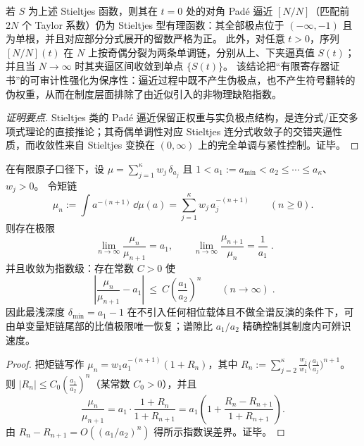 


\begin{proposition}\label{prop:xi-pade-stieltjes-order-preserving}
若 \(S\) 为上述 Stieltjes 函数，则其在 \(t=0\) 处的对角 Pad\'e 逼近 \([N/N]\)（匹配前 \(2N\) 个 Taylor 系数）仍为 Stieltjes 型有理函数：其全部极点位于 \((-\infty,-1)\) 且为单根，并且对应部分分式展开的留数严格为正。
此外，对任意 \(t>0\)，序列 \([N/N](t)\) 在 \(N\) 上按奇偶分裂为两条单调链，分别从上、下夹逼真值 \(S(t)\)；并且当 \(N\to\infty\) 时其夹逼区间收敛到单点 \(\{S(t)\}\)。
该结论把“有限寄存器证书”的可审计性强化为保序性：逼近过程中既不产生伪极点，也不产生符号翻转的伪权重，从而在制度层面排除了由近似引入的非物理缺陷指数。
\end{proposition}
\begin{proof}[证明要点]
Stieltjes 类的 Pad\'e 逼近保留正权重与实负极点结构，是连分式/正交多项式理论的直接推论；其奇偶单调性对应 Stieltjes 连分式收敛子的交错夹逼性质，而收敛性来自 Stieltjes 变换在 \((0,\infty)\) 上的完全单调与紧性控制。证毕。
\end{proof}

\begin{proposition}\label{prop:xi-moment-ratio-identifies-amin}
在有限原子口径下，设
\(
\mu=\sum_{j=1}^{\kappa} w_j\,\delta_{a_j}
\)
且 \(1<a_1:=a_{\min}<a_2\le\cdots\le a_{\kappa}\)、\(w_j>0\)。
令矩链
\[
\mu_n:=\int a^{-(n+1)}\,\dd\mu(a)=\sum_{j=1}^{\kappa} w_j\,a_j^{-(n+1)}\qquad(n\ge 0).
\]
则存在极限
\[
\boxed{\;
\lim_{n\to\infty}\frac{\mu_n}{\mu_{n+1}}=a_1,
\qquad
\lim_{n\to\infty}\frac{\mu_{n+1}}{\mu_n}=\frac{1}{a_1}\; }.
\]
并且收敛为指数级：存在常数 \(C>0\) 使
\[
\boxed{\;
\left|\frac{\mu_n}{\mu_{n+1}}-a_1\right|
\ \le\ C\left(\frac{a_1}{a_2}\right)^{n}\qquad(n\to\infty)\; }.
\]
因此最浅深度 \(\delta_{\min}=a_1-1\) 在不引入任何相位载体且不做全谱反演的条件下，可由单变量矩链尾部的比值极限唯一恢复；谱隙比 \(a_1/a_2\) 精确控制其制度内可辨识速度。
\end{proposition}
\begin{proof}
把矩链写作 \(\mu_n=w_1a_1^{-(n+1)}(1+R_n)\)，其中
\(
R_n:=\sum_{j=2}^{\kappa}\frac{w_j}{w_1}\bigl(\frac{a_1}{a_j}\bigr)^{n+1}
\)。
则 \(|R_n|\le C_0(\frac{a_1}{a_2})^{n}\)（某常数 \(C_0>0\)），并且
\[
\frac{\mu_n}{\mu_{n+1}}
=a_1\cdot\frac{1+R_n}{1+R_{n+1}}
=a_1\left(1+\frac{R_n-R_{n+1}}{1+R_{n+1}}\right).
\]
由 \(R_n-R_{n+1}=O((a_1/a_2)^n)\) 得所示指数误差界。证毕。
\end{proof}

